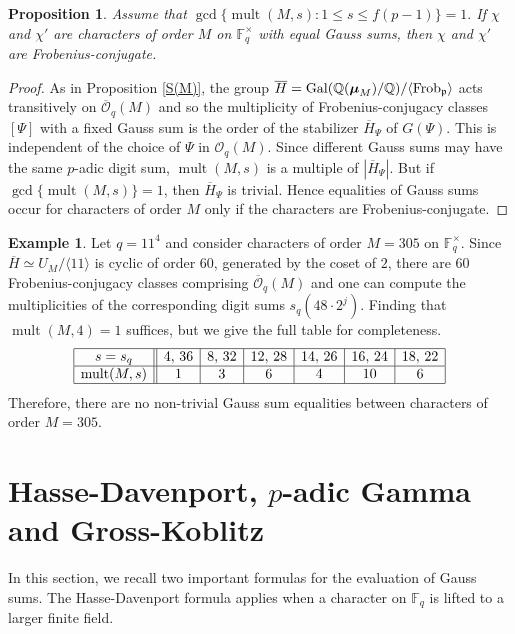 \documentclass[12pt]{amsart}  \usepackage{amsmath,amssymb,enumerate,amscd,tikz,url}
\numberwithin{equation}{section}
\newtheorem{prop}[equation]{Proposition}
\theoremstyle{definition}
\newtheorem{Ex}[equation]{Example}
\newcommand{\F}{{\mathbb F}}
\newcommand{\Q}{{\mathbb Q}}
\newcommand{\Mu}{\boldsymbol \mu}
\newcommand{\gp}{{\mathfrak p}}
\newcommand{\cO}{{\mathcal O}}
\newcommand{\Gal}{\operatorname{Gal}}
\newcommand{\mult}{\operatorname{mult}}
\newcommand{\Frob}{{\rm Frob}}
\newcommand{\lr}[1]{{\langle {#1} \rangle}}
\newcommand{\vv}[1]{{\left\vert {#1} \right\vert}}
\newcommand{\ov}[1]{\overline{#1}}
\begin{document}
\begin{prop}\label{sameorderclass}
Assume that 
$
\gcd \{\mult(M,s) : 1 \le s \le f(p-1) \} = 1.
$  
If $\chi$ and $\chi'$ are characters of order $M$ on $\F_q^\times$ with equal Gauss sums, then $\chi$ and $\chi'$ are Frobenius-conjugate.  
\end{prop}

\begin{proof}
As in Proposition \ref{S(M)}, the group $\ov{H} = \Gal(\Q(\Mu_M)/\Q)/\lr{\Frob_\gp}$ acts transitively on $\ov{\cO}_q(M)$ and so the multiplicity of Frobenius-conjugacy classes $[\Psi]$ with a fixed Gauss sum is the order of the stabilizer $\ov{H}_\Psi$ of $G(\Psi)$.  This is independent of the choice of $\Psi$ in $\cO_q(M)$.  Since different Gauss sums may have the same $p$-adic digit sum, $\mult(M,s)$ is a multiple of $\vv{\ov{H}_\Psi}$.  But if $\gcd\{\mult(M,s) \} = 1$, then $\ov{H}_\Psi$ is trivial.  Hence equalities of Gauss sums occur for characters of order $M$ only if the characters are Frobenius-conjugate.
\end{proof}

\begin{Ex} \label{Ex300}
Let $q = 11^4$ and consider characters of order $M = 305$ on $\F_q^\times$.   Since $\ov{H} \simeq U_M/\lr{11}$ is cyclic of order 60, generated by the coset of $2$, there are 60 Frobenius-conjugacy classes comprising $\ov{\cO}_q(M)$ and one can compute the multiplicities of the corresponding digit sums $s_q(48 \cdot 2^j)$.  Finding that $\mult(M,4) = 1$ suffices, but we give the full table for completeness.
$$
\begin{array}{ | c || c | c | c | c | c | c | c | c | c | c | c | c}
\hline
s  = s_q & 4, \, 36 & 8,\, 32 & 12, \, 28 & 14, \, 26 & 16, \,  24 &18, \, 22 \\ 
\hline
\mult(M,s) & 1 & 3 & 6 & 4 & 10 & 6 \\
\hline
\end{array}
$$
Therefore, there are no non-trivial Gauss sum equalities between characters of order $M =  305$.

\end{Ex}

\section{Hasse-Davenport, $p$-adic Gamma and Gross-Koblitz} \label{HDGK}
In this section, we recall two important formulas for the evaluation of Gauss sums.  The Hasse-Davenport formula \cite[p.~163]{IR} applies when a character on $\F_q$ is lifted to a larger finite field.   
\end{document}
